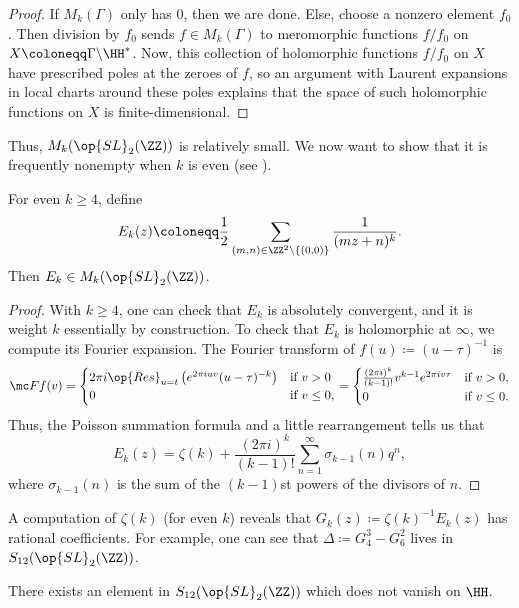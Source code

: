 \documentclass{article}
\begin{document}
\begin{proof}
	If $M_k(\Gamma)$ only has $0$, then we are done. Else, choose a nonzero element $f_0$. Then division by $f_0$ sends $f\in M_k(\Gamma)$ to meromorphic functions $f/f_0$ on $X\coloneqq\Gamma\backslash\HH^*$. Now, this collection of holomorphic functions $f/f_0$ on $X$ have prescribed poles at the zeroes of $f$, so an argument with Laurent expansions in local charts around these poles explains that the space of such holomorphic functions on $X$ is finite-dimensional.
\end{proof}
Thus, $M_k(\op{SL}_2(\ZZ))$ is relatively small. We now want to show that it is frequently nonempty when $k$ is even (see ).
\begin{lemma}
	For even $k\ge4$, define
	\[E_k(z)\coloneqq\frac12\sum_{(m,n)\in\ZZ^2\setminus\{(0,0)\}}\frac1{(mz+n)^{k}}.\]
	Then $E_k\in M_k(\op{SL}_2(\ZZ))$.
\end{lemma}
\begin{proof}
	With $k\ge4$, one can check that $E_k$ is absolutely convergent, and it is weight $k$ essentially by construction. To check that $E_k$ is holomorphic at $\infty$, we compute its Fourier expansion. The Fourier transform of $f(u)\coloneqq(u-\tau)^{-1}$ is
	\[\mc Ff(v)=\begin{cases}
		2\pi i\op{Res}_{u=t}\left(e^{2\pi iuv}(u-\tau)^{-k}\right) & \text{if }v>0 \\
		0 & \text{if }v\le0,
	\end{cases}=\begin{cases}
		\frac{(2\pi i)^k}{(k-1)!}v^{k-1}e^{2\pi iv\tau} & \text{if }v>0, \\
		0 & \text{if }v\le0.
	\end{cases}\]
	Thus, the Poisson summation formula and a little rearrangement tells us that
	\[E_k(z)=\zeta(k)+\frac{(2\pi i)^k}{(k-1)!}\sum_{n=1}^\infty\sigma_{k-1}(n)q^n,\]
	where $\sigma_{k-1}(n)$ is the sum of the $(k-1)$st powers of the divisors of $n$.
\end{proof}
\begin{remark}
	A computation of $\zeta(k)$ (for even $k$) reveals that $G_k(z)\coloneqq\zeta(k)^{-1}E_k(z)$ has rational coefficients. For example, one can see that $\Delta\coloneqq G_4^3-G_6^2$ lives in $S_{12}(\op{SL}_2(\ZZ))$.
\end{remark}
\begin{lemma}
	There exists an element in $S_{12}(\op{SL}_2(\ZZ))$ which does not vanish on $\HH$.
\end{lemma}
\end{document}
